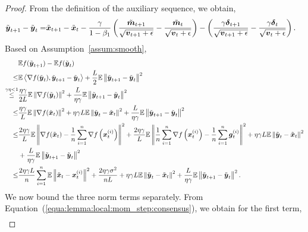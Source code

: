 \begin{proof}
From the definition of the auxiliary sequence, we obtain,
\begin{align*}
    \tilde{\boldsymbol{y}}_{t+1} - \tilde{\boldsymbol{y}}_t = & \tilde{\boldsymbol{x}}_{t+1} - \tilde{\boldsymbol{x}}_t - \frac{\gamma}{1- \beta_1} \left(\frac{\tilde{\boldsymbol{m}}_{t+1}}{\sqrt{\boldsymbol{v}_{t+1}+\epsilon}} - \frac{\tilde{\boldsymbol{m}}_{t}}{\sqrt{\boldsymbol{v}_{t}+\epsilon}} \right) - \left( \frac{\gamma\boldsymbol{\delta}_{t+1}}{\sqrt{\boldsymbol{v}_{t+1}+\epsilon}} - \frac{\gamma\boldsymbol{\delta}_{t}}{\sqrt{\boldsymbol{v}_{t}+\epsilon}}\right).
\end{align*}
Based on Assumption~\ref{assum:smooth},
\begin{align*}
    & \mathbb E f(\tilde{\boldsymbol{y}}_{t+1}) - \mathbb Ef(\tilde{\boldsymbol{y}}_{t}) \\
    \leq & \mathbb E\left\langle \nabla f(\tilde{\boldsymbol{y}}_t), \tilde{\boldsymbol{y}}_{t+1} - \tilde{\boldsymbol{y}}_t \right\rangle + \frac{L}{2}\mathbb E\left\|\tilde{\boldsymbol{y}}_{t+1} - \tilde{\boldsymbol{y}}_t \right\|^2 \\
        \overset{\gamma\eta<1}{\leq}& \frac{\eta\gamma}{2L}\mathbb E\left\|\nabla f(\tilde{\boldsymbol{y}}_t)\right\|^2 + \frac{L}{\eta\gamma}\mathbb E\left\|\tilde{\boldsymbol{y}}_{t+1} - \tilde{\boldsymbol{y}}_t \right\|^2 \\
    \leq & \frac{\eta\gamma}{L}\mathbb E\left\|\nabla f(\tilde{\boldsymbol{x}}_t)\right\|^2 + \eta\gamma L\mathbb E\left\| \tilde{\boldsymbol{y}}_t - \tilde{\boldsymbol{x}}_t\right\|^2 + \frac{L}{\eta\gamma}\mathbb E\left\|\tilde{\boldsymbol{y}}_{t+1} - \tilde{\boldsymbol{y}}_t \right\|^2 \\
        \leq & \frac{2\eta\gamma}{L}\mathbb E\left\|\nabla f(\tilde{\boldsymbol{x}}_t) - \frac{1}{n}\sum_{i=1}^{n}\nabla f\left( \boldsymbol{x}_t^{(i)} \right)\right\|^2 + \frac{2\eta\gamma}{L}\mathbb E\left\|\frac{1}{n}\sum_{i=1}^{n}\nabla f\left( \boldsymbol{x}_t^{(i)}\right) - \frac{1}{n}\sum_{i=1}^{n} \boldsymbol{g}_t^{(i)} \right\|^2 + \eta\gamma L\mathbb E\left\| \tilde{\boldsymbol{y}}_t - \tilde{\boldsymbol{x}}_t\right\|^2 \\
        & + \frac{L}{\eta\gamma}\mathbb E\left\|\tilde{\boldsymbol{y}}_{t+1} - \tilde{\boldsymbol{y}}_t \right\|^2 \\
    \leq & \frac{2\eta\gamma L}{n}\sum_{i=1}^{n}\mathbb E\left\|\tilde{\boldsymbol{x}}_t - \boldsymbol{x}_t^{(i)}\right\|^2 + \frac{2\eta\gamma\sigma^2}{nL} + \eta\gamma L\mathbb E\left\| \tilde{\boldsymbol{y}}_t - \tilde{\boldsymbol{x}}_t\right\|^2  + \frac{L}{\eta\gamma}\mathbb E\left\|\tilde{\boldsymbol{y}}_{t+1} - \tilde{\boldsymbol{y}}_t \right\|^2.
\end{align*}
We now bound the three norm terms separately. 
From Equation~(\ref{equa:lemma:local:mom_step:consensus}), we obtain for the first term,
\begin{align*}

\end{align*}
\end{proof}
